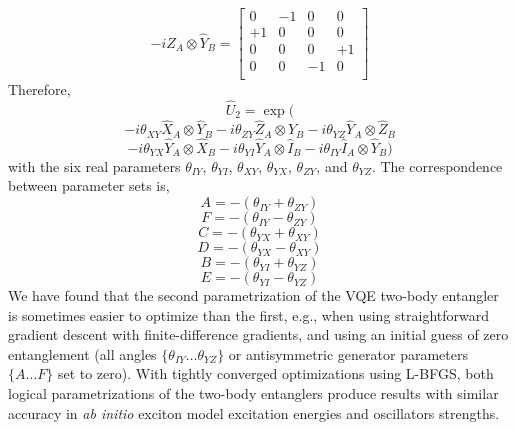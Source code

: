 \begin{equation}
-i \hat Z_{A} \otimes \hat Y_{B}
=
\left [
\begin{array}{cccc}
 0 & -1 &  0 &  0 \\
+1 &  0 &  0 &  0 \\
 0 &  0 &  0 & +1 \\
 0 &  0 & -1 &  0 \\
\end{array}
\right ]
\end{equation}
Therefore, 
\begin{equation}
\label{eq:so4mark2}
\hat U_2
=
\exp(
\end{equation}
\[
-i \theta_{XY} \hat X_{A} \otimes \hat Y_{B}
-i \theta_{ZY} \hat Z_{A} \otimes \hat Y_{B}
-i \theta_{YZ} \hat Y_{A} \otimes \hat Z_{B}
\]
\[
-i \theta_{YX} \hat Y_{A} \otimes \hat X_{B}
-i \theta_{YI} \hat Y_{A} \otimes \hat I_{B}
-i \theta_{IY} \hat I_{A} \otimes \hat Y_{B}
)
\]
with the six real parameters
$\theta_{IY}$,
$\theta_{YI}$,
$\theta_{XY}$,
$\theta_{YX}$,
$\theta_{ZY}$, and
$\theta_{YZ}$.
The correspondence between parameter sets is,
\begin{equation}
A = -(\theta_{IY} + \theta_{ZY})
\end{equation}
\begin{equation}
F = -(\theta_{IY} - \theta_{ZY})
\end{equation}
\begin{equation}
C = -(\theta_{YX} + \theta_{XY})
\end{equation}
\begin{equation}
D = -(\theta_{YX} - \theta_{XY})
\end{equation}
\begin{equation}
B = -(\theta_{YI} + \theta_{YZ})
\end{equation}
\begin{equation}
E = -(\theta_{YI} - \theta_{YZ}) 
\end{equation}
We have found that the second parametrization of the VQE two-body entangler is
sometimes easier to optimize than the first, e.g., when using straightforward
gradient descent with finite-difference gradients, and using an initial guess of
zero entanglement (all angles $\{ \theta_{IY} \ldots \theta_{YZ} \}$ or
antisymmetric generator parameters $\{ A \ldots F \}$ set to zero). With tightly
converged optimizations using L-BFGS, both logical parametrizations of the
two-body entanglers produce results with similar accuracy in \emph{ab initio}
exciton model excitation energies and oscillators strengths.

